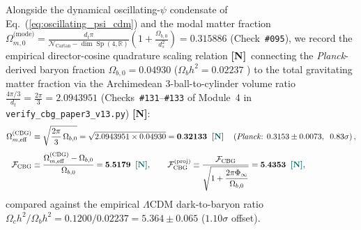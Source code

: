 \documentclass[11pt,a4paper]{article}
\newcommand{\catN}{\textbf{\textcolor{teal!75!black}{[N]}}}
\theoremstyle{plain}
\theoremstyle{definition}
\theoremstyle{remark}
\numberwithin{equation}{section}
\begin{document}
Alongside the dynamical oscillating-$\psi$ condensate of Eq.~(\ref{eq:oscillating_psi_cdm}) and the modal matter fraction $\Omega_{m,0}^{\text{(mode)}} = \frac{d_t\pi}{\mathcal{N}_{\text{Cartan}}-\dim\operatorname{Sp}(4,\mathbb{R})}(1 + \frac{\Omega_{b,0}}{d_s^2}) = \mathbf{0.315886}$ (Check~\texttt{\#095}), we record the empirical director-cosine quadrature scaling relation \catN\ connecting the \textit{Planck}-derived baryon fraction $\Omega_{b,0} = 0.04930$ ($\Omega_b h^2 = 0.02237$ \cite{planck2018_vi}) to the total gravitating matter fraction via the Archimedean 3-ball-to-cylinder volume ratio $\frac{4\pi/3}{d_t} = \frac{2\pi}{3} = 2.0943951$ (Checks~\texttt{\#131}--\texttt{\#133} of Module~4 in \allowbreak\texttt{verify\_cbg\_paper3\_v13.py}) \catN:
\begin{align}
\Omega_{m,\text{eff}}^{\text{(CBG)}} &\equiv \sqrt{\frac{2\pi}{3}\,\Omega_{b,0}} = \sqrt{2.0943951 \times 0.04930} = \mathbf{0.32133} \;\;\catN \quad \left(\text{\textit{Planck}: } 0.3153 \pm 0.0073, \;\; 0.83\sigma\right), \label{eq:exact_omega_m_eff_quadrature} \\[4pt]
\mathcal{F}_{\text{CBG}} &\equiv \frac{\Omega_{m,\text{eff}}^{\text{(CBG)}} - \Omega_{b,0}}{\Omega_{b,0}} = \mathbf{5.5179} \;\;\catN, \qquad \mathcal{F}_{\text{CBG}}^{\text{(proj)}} \equiv \frac{\mathcal{F}_{\text{CBG}}}{\sqrt{1 + \dfrac{2\pi\Phi_{\infty}}{\Omega_{b,0}}}} = \mathbf{5.4353} \;\;\catN,
\label{eq:exact_536_ratio_theorem}
\end{align}
compared against the empirical $\Lambda\text{CDM}$ dark-to-baryon ratio $\Omega_c h^2 / \Omega_b h^2 = 0.1200 / 0.02237 = \mathbf{5.364 \pm 0.065}$ ($1.10\sigma$ offset).
\end{document}
